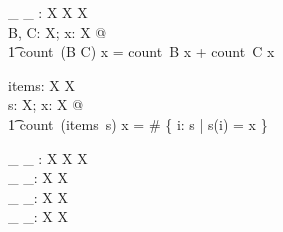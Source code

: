 \documentclass[11pt,a4paper]{article}
\begin{document}

\begin{gendef}[X]
	\_ \uplus \_ :  \bag X \cross \bag X \fun \bag X \\
\where
	\forall B, C: \bag X; x: X @ \\
	\t1	count~(B \uplus C) x = count~B x + count~C x \\
\end{gendef}


\begin{gendef}[X]
	items:  \seq X \fun \bag X \\
\where
	\forall s: \seq X; x: X @ \\
	\t1	count~(items~s) x = \# \{ i: \dom s | s(i) = x \} \\
\end{gendef}


\begin{gendef}[X]
	\_ \uminus \_ :  \bag X \cross \bag X \fun \bag X \\
	\_ \bcount \_: \bag X \cross X \fun \nat \\
	\_ \otimes \_: \nat \cross \bag X \fun \bag X \\
	\_ \subbageq \_: \bag X \rel \bag X \\
\end{gendef}
\end{document}
